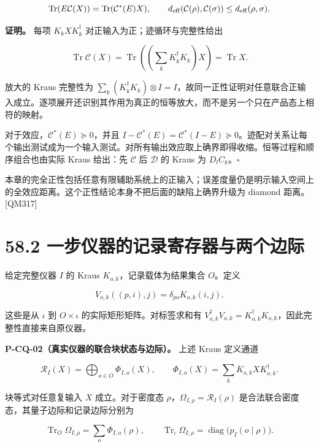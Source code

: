 \documentclass[
  11pt,
  oneside]{book}
\begin{document}
\[
\operatorname{Tr}(E\mathcal C(X))=\operatorname{Tr}(\mathcal C^*(E)X),\qquad
d_{\rm eff}(\mathcal C(\rho),\mathcal C(\sigma))\le d_{\rm eff}(\rho,\sigma).
\]

\textbf{证明。} 每项 \(K_kXK_k^\dagger\)
对正输入为正；迹循环与完整性给出

\[
\operatorname{Tr}\mathcal C(X)
=\operatorname{Tr}\!\left(\left(\sum_kK_k^\dagger K_k\right)X\right)
=\operatorname{Tr}X.
\]

放大的 Kraus 完整性为
\(\sum_k(K_k^\dagger K_k)\otimes I=I\)，故同一正性证明对任意联合正输入成立。逐项展开还识别其作用为真正的恒等放大，而不是另一个只在产品态上相符的映射。

对于效应，\(\mathcal C^*(E)\succeq0\)，并且
\(I-\mathcal C^*(E)=\mathcal C^*(I-E)\succeq0\)。迹配对关系让每个输出测试成为一个输入测试。对所有输出效应取上确界即得收缩。恒等过程和顺序组合也由实际
Kraus 给出：先 \(\mathcal C\) 后 \(\mathcal D\) 的 Kraus 为
\(D_lC_k\)。\(\square\)

本章的完全正性包括任意有限辅助系统上的正输入；误差度量仍是明示输入空间上的全效应距离。这个正性结论本身不把后面的缺陷上确界升级为
diamond 距离。{[}QM317{]}

\hypertarget{ux4e00ux6b65ux4eeaux5668ux7684ux8bb0ux5f55ux5bc4ux5b58ux5668ux4e0eux4e24ux4e2aux8fb9ux9645}{%
\section{58.2
一步仪器的记录寄存器与两个边际}\label{ux4e00ux6b65ux4eeaux5668ux7684ux8bb0ux5f55ux5bc4ux5b58ux5668ux4e0eux4e24ux4e2aux8fb9ux9645}}

给定完整仪器 \(I\) 的 Kraus \(K_{o,k}\)，记录载体为结果集合 \(O\)。定义

\[
V_{o,k}((p,i),j)=\delta_{po}K_{o,k}(i,j).
\]

这些是从 \(\iota\) 到 \(O\times\iota\) 的实际矩形矩阵。对标签求和有
\(V_{o,k}^\dagger V_{o,k}=K_{o,k}^\dagger K_{o,k}\)，因此完整性直接来自原仪器。

\protect\hypertarget{p-cq-02}{}{}

\textbf{P-CQ-02（真实仪器的联合块状态与边际）。} 上述 Kraus 定义通道

\[
\mathcal R_I(X)=\bigoplus_{o\in O}\Phi_{I,o}(X),\qquad
\Phi_{I,o}(X)=\sum_kK_{o,k}XK_{o,k}^\dagger.
\]

块等式对任意复输入 \(X\) 成立。对于密度态
\(\rho\)，\(\Omega_{I,\rho}=\mathcal R_I(\rho)\)
是合法联合密度态，其量子边际和记录边际分别为

\[
\operatorname{Tr}_{O}\Omega_{I,\rho}=\sum_o\Phi_{I,o}(\rho),\qquad
\operatorname{Tr}_{\iota}\Omega_{I,\rho}
=\operatorname{diag}\bigl(p_I(o\mid\rho)\bigr).
\]
\end{document}
